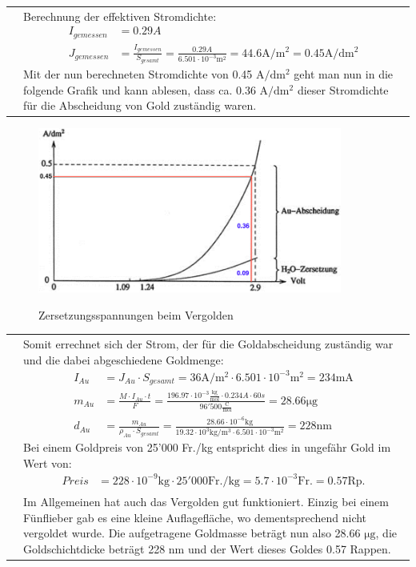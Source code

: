 \begin{longtable}{p{3cm}p{14cm}}
    & Berechnung der effektiven Stromdichte:
    $$\begin{aligned}
        I_{gemessen} &= 0.29 A\\
        J_{gemessen} &= \frac{I_{gemessen}}{S_{gesamt}} = \frac{0.29 A}{6.501 \cdot 10^{-3} \mathrm{m^2}} = 44.6 \mathrm{A/m^2} = 0.45 \mathrm{A/dm^2}
    \end{aligned}$$
    Mit der nun berechneten Stromdichte von 0.45 $\mathrm{A/dm^2}$ geht man nun in die folgende Grafik und kann ablesen, dass ca. 0.36 $\mathrm{A/dm^2}$ dieser Stromdichte für die Abscheidung von Gold zuständig waren.
\end{longtable}
\begin{figure}[H]\centering
    \includegraphics[width=10cm]{./pictures/AuAbscheidung.png}\\
    \caption{Zersetzungsspannungen beim Vergolden}
\end{figure}

\begin{longtable}{p{3cm}p{14cm}}
    & Somit errechnet sich der Strom, der für die Goldabscheidung zuständig war und die dabei abgeschiedene Goldmenge:
    $$\begin{aligned}
        I_{Au} &= J_{Au} \cdot S_{gesamt} = 36 \mathrm{A/m^2} \cdot 6.501 \cdot 10^{-3} \mathrm{m^2} = 234 \mathrm{mA}\\
        m_{Au} &= \frac{M \cdot I_{Au} \cdot t}{F} = \frac{196.97 \cdot 10^{-3} \frac{\mathrm{kg}}{\mathrm{mol}} \cdot 0.234 A \cdot 60 s}{96'500 \frac{\mathrm{C}}{\mathrm{mol}}} = 28.66 \mathrm{\mu g}\\
        d_{Au} &= \frac{m_{Au}}{\rho_{Au} \cdot S_{gesamt}} = \frac{28.66 \cdot 10^{-6} \mathrm{kg}}{19.32 \cdot 10^3 \mathrm{kg/m^3} \cdot 6.501 \cdot 10^{-3} \mathrm{m^2}} = 228 \mathrm{nm}
    \end{aligned}$$
    Bei einem Goldpreis von 25'000 Fr./kg entspricht dies in ungefähr Gold im Wert von:
    $$\begin{aligned}
        Preis &= 228 \cdot 10^{-9} \mathrm{kg} \cdot 25'000 \mathrm{Fr./kg} = 5.7 \cdot 10^{-3} \mathrm{Fr.} = 0.57 \mathrm{Rp.}
    \end{aligned}$$\\
    
    & Im Allgemeinen hat auch das Vergolden gut funktioniert. Einzig bei einem Fünflieber gab es eine kleine Auflagefläche, wo dementsprechend nicht vergoldet wurde. Die aufgetragene Goldmasse beträgt nun also 28.66 $\mathrm{\mu g}$, die Goldschichtdicke beträgt 228 nm und der Wert dieses Goldes 0.57 Rappen.
    
\end{longtable}